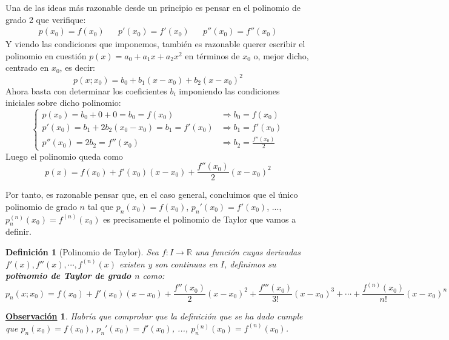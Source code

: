 \documentclass[10pt,a4paper,openright]{book}
\theoremstyle{break}
\newtheorem{defi}{Definición}[chapter]
\newtheorem{obs}{\underline{Observación}}[chapter]
\begin{document}
Una de las ideas más razonable desde un principio es pensar en el polinomio de grado 2 que verifique:
\begin{align*}
p(x_0)=f(x_0)  & &
p'(x_0)=f'(x_0) & &
p''(x_0)=f''(x_0)
\end{align*}
Y viendo las condiciones que imponemos, también es razonable querer escribir el polinomio en cuestión $p(x)=a_0+a_1x+a_2x^2$ en términos de $x_0$ o, mejor dicho, centrado en $x_0$, es decir:
$$p(x; x_0)=b_0+b_1(x-x_0)+b_2(x-x_0)^2$$
Ahora basta con determinar los coeficientes $b_i$ imponiendo las condiciones iniciales sobre dicho polinomio:
$$\begin{cases} p(x_0)=b_0+0+0=b_0=f(x_0)&\Rightarrow b_0=f(x_0)\\
p'(x_0)=b_1+2b_2(x_0-x_0)=b_1=f'(x_0)&\Rightarrow b_1=f'(x_0)\\
p''(x_0)=2b_2=f''(x_0)&\Rightarrow b_2= \frac{f''(x_0)}{2}\end{cases}$$
Luego el polinomio queda como
$$p(x)=f(x_0)+f'(x_0)(x-x_0)+\frac{f''(x_0)}{2}(x-x_0)^2$$

Por tanto, es razonable pensar que, en el caso general, concluimos que el único polinomio de grado $n$ tal que $p_n(x_0)=f(x_0)$, $p_n'(x_0)=f'(x_0)$, ..., $p_n^{(n)}(x_0)=f^{(n)}(x_0)$ es precisamente el polinomio de Taylor que vamos a definir.

\begin{defi}[Polinomio de Taylor]
Sea $f: I\rightarrow \mathbb{R}$ una función cuyas derivadas $f'(x), f''(x), \cdots, f^{(n)}(x)$ existen y son continuas en $I$, definimos su \textbf{polinomio de Taylor de grado $n$} como:
$$p_n(x; x_0)=f(x_0)+f'(x_0)(x-x_0)+\frac{f''(x_0)}{2}(x-x_0)^2+\frac{f'''(x_0)}{3!}(x-x_0)^3+ \cdots +\frac{f^{(n)}(x_0)}{n!}(x-x_0)^n$$
\end{defi}

\begin{obs}
Habría que comprobar que la definición que se ha dado cumple que $p_n(x_0)=f(x_0)$, $p_n'(x_0)=f'(x_0)$, ..., $p_n^{(n)}(x_0)=f^{(n)}(x_0)$.
\end{obs}
\end{document}
